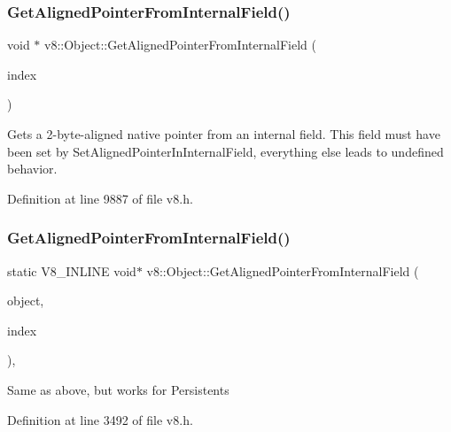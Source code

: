 \subsubsection{\texorpdfstring{Get\+Aligned\+Pointer\+From\+Internal\+Field()}{GetAlignedPointerFromInternalField()}\hspace{0.1cm}{\footnotesize\ttfamily [1/2]}}
{\footnotesize\ttfamily void $\ast$ v8\+::\+Object\+::\+Get\+Aligned\+Pointer\+From\+Internal\+Field (\begin{DoxyParamCaption}\item[{int}]{index }\end{DoxyParamCaption})}

Gets a 2-\/byte-\/aligned native pointer from an internal field. This field must have been set by Set\+Aligned\+Pointer\+In\+Internal\+Field, everything else leads to undefined behavior. 

Definition at line 9887 of file v8.\+h.

\mbox{\label{classv8_1_1Object_a65b5a3dc93c0774594f8b0f2ab5481c8}} 
\subsubsection{\texorpdfstring{Get\+Aligned\+Pointer\+From\+Internal\+Field()}{GetAlignedPointerFromInternalField()}\hspace{0.1cm}{\footnotesize\ttfamily [2/2]}}
{\footnotesize\ttfamily static V8\+\_\+\+I\+N\+L\+I\+NE void$\ast$ v8\+::\+Object\+::\+Get\+Aligned\+Pointer\+From\+Internal\+Field (\begin{DoxyParamCaption}\item[{const \mbox{\hyperlink{classv8_1_1PersistentBase}{Persistent\+Base}}$<$ \mbox{\hyperlink{classv8_1_1Object}{Object}} $>$ \&}]{object,  }\item[{int}]{index }\end{DoxyParamCaption})\hspace{0.3cm}{\ttfamily [inline]}, {\ttfamily [static]}}

Same as above, but works for Persistents 

Definition at line 3492 of file v8.\+h.

\mbox{\label{classv8_1_1Object_a7bbe987794658f20a3ec1b68326305e6}} 

